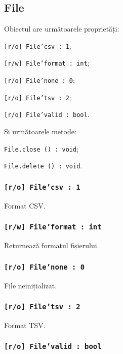 \subsection{File}

Obiectul \file{} are următoarele proprietăți:
\begin{icItems}
	\item \texttt{[r/o] File'csv : 1};
	\item \texttt{[r/w] File'format : int};
	\item \texttt{[r/o] File'none : 0};
	\item \texttt{[r/o] File'tsv : 2};
	\item \texttt{[r/o] File'valid : bool}.
\end{icItems}

Și următoarele metode:
\begin{icItems}
	\item \texttt{File.close () : void};
	\item \texttt{File.delete () : void}.
\end{icItems}

\subsubsection{\texttt{[r/o] File'csv : 1}}

Format CSV.

\subsubsection{\texttt{[r/w] File'format : int}}

Returnează formatul fișierului.

\subsubsection{\texttt{[r/o] File'none : 0}}

File neinițializat.

\subsubsection{\texttt{[r/o] File'tsv : 2}}

Format TSV.

\subsubsection{\texttt{[r/o] File'valid : bool}}

